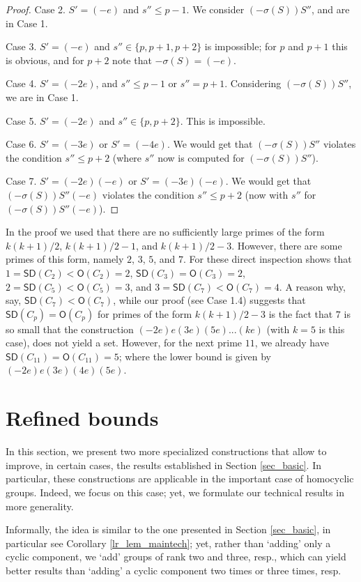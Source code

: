\documentclass{amsart}
\theoremstyle{definition}
\numberwithin{equation}{section}
\begin{document}
\begin{proof}
\noindent
Case 2. $S'=(-e)$ and $s'' \le p -1$.
We consider $(-\sigma(S))S''$, and are in Case 1.

\noindent
Case 3. $S'=(-e)$ and $s'' \in \{ p , p+1,p+2\}$ is impossible; for $p$ and $p+1$ this is obvious, and
for $p+2$ note that $-\sigma(S)= (-e)$.

\noindent
Case 4. $S'=(-2e)$, and $s'' \le p -1$ or $s'' = p +1$.  Considering $(-\sigma(S))S''$, we are in  Case 1.

\noindent
Case 5. $S'=(-2e)$ and $s'' \in \{ p , p+2 \}$. This is impossible.

\noindent
Case 6. $S'=(-3e)$ or $S'=(-4e)$.  We would get that $(-\sigma(S))S''$ violates the condition $s'' \le p+2$ (where
$s''$ now is computed for $(-\sigma(S))S''$).

\noindent
Case 7. $S'=(-2e)(-e)$ or  $S'=(-3e)(-e)$. We would get that $(-\sigma(S))S''(-e)$ violates the condition $s'' \le p+2$
(now with $s''$ for $(-\sigma(S))S''(-e)$).
\end{proof}
In the proof we used that there are no sufficiently large primes of the form
$k(k+1)/2$, $k(k+1)/2 -1$, and $k(k+1)/2 -3$. However, there are some primes of this form, namely $2$, $3$, $5$, and $7$.
For these direct inspection shows that
$1={\mathsf{SD}}(C_2)<{\mathsf{O}}(C_2)=2$, ${\mathsf{SD}}(C_3)={\mathsf{O}}(C_3)=2$, $2={\mathsf{SD}}(C_5)<{\mathsf{O}}(C_5)=3$, and
$3={\mathsf{SD}}(C_7)<{\mathsf{O}}(C_7)=4$. A reason why, say, ${\mathsf{SD}}(C_7)<{\mathsf{O}}(C_7)$,
while our proof (see Case 1.4)  suggests that ${\mathsf{SD}}(C_p)={\mathsf{O}}(C_p)$ for primes of the form $k(k+1)/2 -3$ is the fact that $7$ is so small that the
construction $(-2e)e(3e)(5e)... (ke)$ (with $k=5$ is this case),
does not yield a set.
However, for the next prime $11$, we already have ${\mathsf{SD}}(C_{11})={\mathsf{O}}(C_{11})=5$;
where the lower bound is given by $(-2e)e(3e)(4e)(5e)$.

\section{Refined bounds}
\label{sec_refined}

In this section, we present two more specialized constructions
that allow to improve, in certain cases, the results established
in Section \ref{sec_basic}. In particular,
these constructions are applicable in the important case of homocyclic groups.
Indeed, we focus on this case; yet, we formulate our technical results in more generality.

Informally, the idea is similar to the one presented in Section \ref{sec_basic}, in particular see Corollary \ref{lr_lem_maintech};
yet, rather than `adding' only a cyclic component, we `add'
groups of rank two and three, resp., which can yield better results
than `adding' a cyclic component two times or three times, resp.
\end{document}
